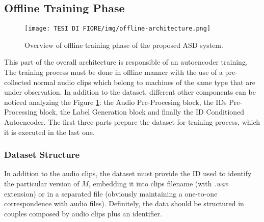 \subsection{Offline Training Phase}
\begin{figure}[ht]
\texttt{[image: TESI DI FIORE/img/offline-architecture.png]}
\centering
\caption{Overview of offline training phase of the proposed ASD system.}
\label{offline-asd-system}
\end{figure}
This part of the overall architecture is responsible of an autoencoder training. The training process must be done in offline manner with the use of a pre-collected normal audio clips which belong to machines of the same type that are under observation. In addition to the dataset, different other components can be noticed analyzing the Figure \ref{offline-asd-system}: the Audio Pre-Procesing block, the IDs Pre-Processing block, the Label Generation block and finally the ID Conditioned Autoencoder. The first three parts prepare the dataset for training process, which it is executed in the last one.
\subsubsection{Dataset Structure}
In addition to the audio clips, the dataset must provide the ID used to identify the particular version of $M$, embedding it into clips filename (with \textit{.wav} extension) or in a separated file (obviously maintaining a one-to-one correspondence with audio files). Definitely, the data should be structured in couples composed by audio clips plus an identifier.
